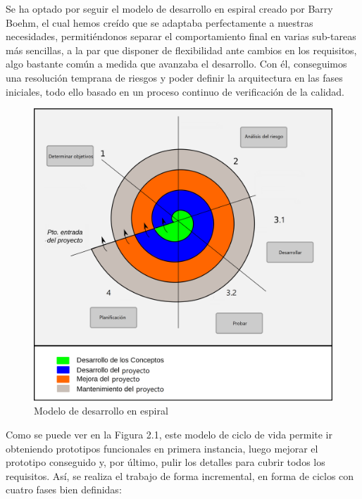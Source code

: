 Se ha optado por seguir el modelo de desarrollo en espiral creado por Barry Boehm, el cual hemos creído que se adaptaba perfectamente a nuestras necesidades, permitiéndonos separar el comportamiento final en varias sub-tareas más sencillas, a la par que disponer de flexibilidad ante cambios en los requisitos, algo bastante común a medida que avanzaba el desarrollo. Con él, conseguimos una resolución temprana de riesgos y poder definir la arquitectura en las fases iniciales, todo ello basado en un proceso continuo de verificación de la calidad.

\begin{figure}[H]
  \begin{center}
    \includegraphics[width=0.9\linewidth]{figures/modelo_espiral.png}
		\caption{Modelo de desarrollo en espiral}
		\label{fig.espiral}
		\end{center}
\end{figure}

Como se puede ver en la Figura 2.1, este modelo de ciclo de vida permite ir obteniendo prototipos funcionales en primera instancia, luego mejorar el prototipo conseguido y, por último, pulir los detalles para cubrir todos los requisitos.  Así, se realiza el trabajo de forma incremental, en forma de ciclos con cuatro fases bien definidas:

